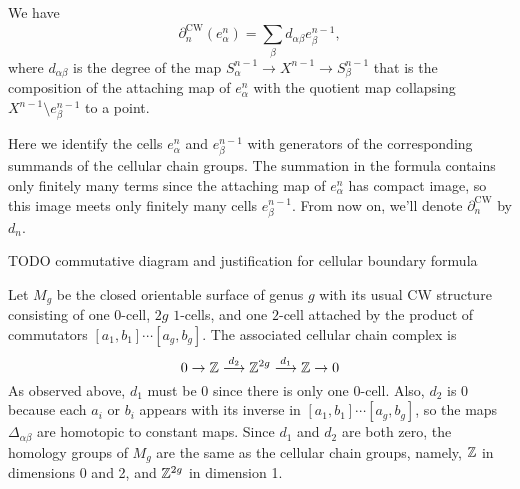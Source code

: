 \begin{prop}
   We have \[
       \partial _n ^{\text{CW}}(e_{\alpha }^n )=\sum_{\beta }^{} d_{\alpha \beta }e_{\beta }^{n-1},
   \] where $d_{\alpha \beta }$ is the degree of the map $S_{\alpha }^{n-1}\to X^{n-1}\to S_{\beta }^{n-1}$ that is the composition of the attaching map of $e_{\alpha }^n $ with the quotient map collapsing $X^{n-1}\setminus  e_{\beta }^{n-1}$ to a point. 
\end{prop}
Here we identify the cells $e_{\alpha }^n $ and $e_{\beta }^{n-1}$ with generators of the corresponding summands of the cellular chain groups. The summation in the formula contains only finitely many terms since the attaching map of $e_{\alpha }^n $ has compact image, so this image meets only finitely many cells $e_{\beta }^{n-1}$. From now on, we'll denote $\partial _n ^{\text{CW}}$ by $d_n $.

TODO commutative diagram and justification for cellular boundary formula

\begin{example}
    Let $M_g$ be the closed orientable surface of genus $g$ with its usual CW structure consisting of one $0$-cell, $2g$ $1$-cells, and one $2$-cell attached by the product of commutators $[a_1,b_1]\cdots [a_g,b_g]$. The associated cellular chain complex is \[
    0\to \mathbb{Z} \overset{d_2}{\longrightarrow}\mathbb{Z}^{2g} \overset{d_1}{\longrightarrow}\mathbb{Z} \to 0
\] As observed above, $d_1$ must be 0 since there is only one $0$-cell. Also, $d_2$ is 0 because each $a_i $ or $b_i $ appears with its inverse in $[a_1,b_1]\cdots [a_g,b_g]$, so the maps $\Delta _{\alpha \beta }$ are homotopic to constant maps. Since $d_1$ and $d_2$ are both zero, the homology groups of $M_g$ are the same as the cellular chain groups, namely, $\mathbb{Z}$ in dimensions 0 and 2, and $\mathbb{Z}^{2g}$ in dimension 1.
\end{example}

